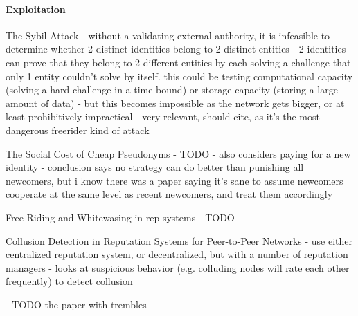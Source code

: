 \paragraph{Exploitation}
\cite{douceur2002sybil}
The Sybil Attack
- without a validating external authority, it is infeasible to determine whether
  2 distinct identities belong to 2 distinct entities
- 2 identities can prove that they belong to 2 different entities by each
  solving a challenge that only 1 entity couldn't solve by itself. this could be
  testing computational capacity (solving a hard challenge in a time bound) or
  storage capacity (storing a large amount of data)
- but this becomes impossible as the network gets bigger, or at least
  prohibitively impractical
- very relevant, should cite, as it's the most dangerous freerider kind of
  attack

\cite{friedman2001social}
The Social Cost of Cheap Pseudonyms
- TODO
- also considers paying for a new identity
- conclusion says no strategy can do better than punishing all newcomers, but i
  know there was a paper saying it's sane to assume newcomers cooperate at the
  same level as recent newcomers, and treat them accordingly

\cite{feldman2006freeriding}
Free-Riding and Whitewasing in rep systems
- TODO

\cite{li2012collusion}
Collusion Detection in Reputation Systems for Peer-to-Peer Networks
- use either centralized reputation system, or decentralized, but with a number
  of reputation managers
- looks at suspicious behavior (e.g. colluding nodes will rate each other
  frequently) to detect collusion


- TODO the paper with trembles
